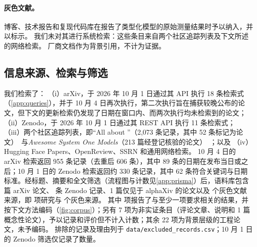 \paragraph{灰色文献。}
博客、技术报告和复现代码库在报告了类型化模型的原始测量结果时予以纳入，并以\gmark{}标示。
我们未对其进行系统检索：这些条目来自两个社区追踪列表及下文所述的网络检索。
厂商文档作为背景引用，不计为证据。

\subsection{信息来源、检索与筛选}
\label{sec:search}

我们检索了：
（i）arXiv，于 2026 年 10 月 1 日通过其 API 执行 18 条检索式（\cref{app:queries}），并于 10 月 4 日再次执行，第二次执行旨在捕获较晚公布的论文，但下文的更新检索仍发现了日期在窗口内、而两次执行均未检索到的论文；
（ii）Zenodo，于 2026 年 10 月 1 日通过其 REST API 执行 11 条检索式；
（iii）两个社区追踪列表，即“All about \jev{}”（2{,}073 条记录，其中 52 条标记为论文）~\cite{xiao2026allaboutjev}与\emph{Awesome System One Models}（213 篇经登记核验的论文）~\cite{rafe2026awesome}；以及
（iv）Hugging Face Papers、OpenReview、SSRN 和通用网络检索。
10 月 4 日的 arXiv 检索返回 955 条记录（去重后 606 条），其中 89 条的日期在发布当日或之后；10 月 1 日的 Zenodo 检索返回约 330 条记录，其中 62 条符合关键词与日期标准。经标题、摘要和全文筛选（流程图与计数见\cref{app:prisma}）后，语料库包含 \nArxiv{} 篇 arXiv 论文、\nZenodo{} 条 Zenodo 记录、1 篇仅见于 alphaXiv 的论文以及 \nGrey{} 个灰色文献来源，即 \nPapers{} 项研究与 \nGrey{} 个灰色来源。
其中 \nCoded{} 项报告了与至少一项要求相关的结果，并按下文方法编码（\cref{fig:corpus}）；另有 7 项为非实证条目（评论文章、说明和 1 篇概念性论文），予以记录和评价但不计入计数；其余 22 项为背景层级的工程论文，未予编码。
排除的记录及理由列于 \nolinkurl{data/excluded_records.csv}；10 月 1 日的 Zenodo 筛选仅记录了数量。

